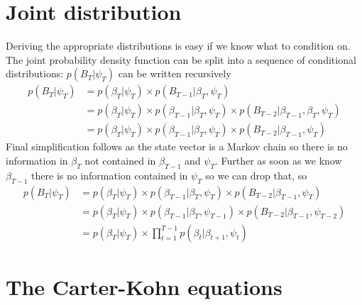 \documentclass[
  letterpaper,
]{book}
\begin{document}
\hypertarget{joint-distribution}{%
\section{Joint distribution}\label{joint-distribution}}

Deriving the appropriate distributions is easy if we know what to
condition on. The joint probability density function can be split into a
sequence of conditional distributions: \(p(B_T|\psi_T)\) can be written
recursively \begin{align}
p(B_T|\psi_T) &= p(\beta_T|\psi_T) \times p(B_{T-1}|\beta_T,\psi_T) \\
&= p(\beta_T|\psi_T) \times p(\beta_{T-1}|\beta_T,\psi_T) \times p(B_{T-2}|\beta_{T-1},\beta_T,\psi_T) \\
&= p(\beta_T|\psi_T) \times p(\beta_{T-1}|\beta_T,\psi_T) \times p(B_{T-2}|\beta_{T-1},\psi_T)
\end{align} Final simplification follows as the state vector is a Markov
chain so there is no information in \(\beta_T\) not contained in
\(\beta_{T-1}\) and \(\psi_T\). Further as soon as we know
\(\beta_{T-1}\) there is no information contained in \(\psi_T\) so we
can drop that, so \begin{align}
p(B_T|\psi_T) &= p(\beta_T|\psi_T)\times p(\beta_{T-1}|\beta_T, \psi_T) \times  p(B_{T-2}|\beta_{T-1},\psi_T) \\
&= p(\beta_T|\psi_T)\times p(\beta_{T-1}|\beta_T, \psi_{T-1}) \times p(B_{T-2}|\beta_{T-1},\psi_{T-2}) \\
&= p(\beta_T|\psi_T) \times \prod_{t=1}^{T-1} p(\beta_t|\beta_{t+1}, \psi_t)
\end{align}

\hypertarget{the-carter-kohn-equations}{%
\section{The Carter-Kohn equations}\label{the-carter-kohn-equations}}
\end{document}

